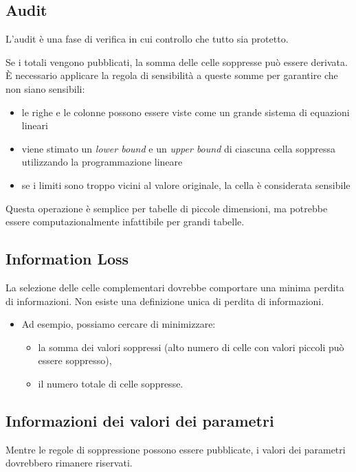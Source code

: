\documentclass{report}
\begin{document}
\subsection{Audit}
L'audit è una fase di verifica in cui controllo che tutto sia protetto.

\noindent Se i totali vengono pubblicati, la somma delle celle soppresse può essere 
derivata. È necessario applicare la regola di sensibilità a queste somme per garantire
che non siano sensibili:
\begin{itemize}
    \item le righe e le colonne possono essere viste come un grande sistema di equazioni lineari 
    \item viene stimato un \textit{lower bound} e un \textit{upper bound} di ciascuna cella soppressa utilizzando la programmazione lineare 
    \item se i limiti sono troppo vicini al valore originale, la cella è considerata sensibile  
\end{itemize}

\noindent Questa operazione è semplice per tabelle di piccole dimensioni, ma potrebbe essere 
computazionalmente infattibile per grandi tabelle.

\subsection{Information Loss}
La selezione delle celle complementari dovrebbe comportare una minima perdita di informazioni. 
Non esiste una definizione unica di perdita di informazioni.
\begin{itemize}
    \item Ad esempio, possiamo cercare di minimizzare:
    \begin{itemize}
        \item la somma dei valori soppressi (alto numero di celle con valori piccoli può essere soppresso),
        \item il numero totale di celle soppresse.
    \end{itemize}
\end{itemize}

\subsection{Informazioni dei valori dei parametri}
Mentre le regole di soppressione possono essere pubblicate, i valori dei parametri 
dovrebbero rimanere riservati. 
\end{document}
